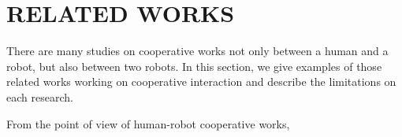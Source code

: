 \section{RELATED WORKS}
There are many studies on cooperative works not only between a human and a robot, but also between two robots. In this section, we give examples of those related works working on cooperative interaction and describe the limitations on each research.\par
\par
From the point of view of human-robot cooperative works, 
